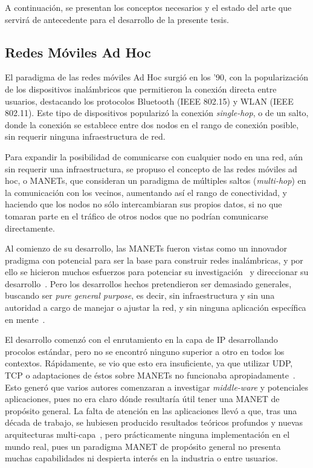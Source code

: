 \documentclass[10pt,preprint,onecolumn]{paper}
\begin{document}
A continuación, se presentan los conceptos necesarios y el estado del arte que servirá de antecedente para el desarrollo de la presente tesis.

\subsection{Redes Móviles Ad Hoc}
\label{sec:manet}
El paradigma de las redes móviles Ad Hoc surgió en los '90, con la popularización de los dispositivos inalámbricos que permitieron la conexión directa entre usuarios, destacando los protocolos Bluetooth (IEEE 802.15) y WLAN (IEEE 802.11). Este tipo de dispositivos popularizó la conexión \emph{single-hop}, o de un salto, donde la conexión se establece entre dos nodos en el rango de conexión posible, sin requerir ninguna infraestructura de red.

Para expandir la posibilidad de comunicarse con cualquier nodo en una red, aún sin requerir una infraestructura, se propuso el concepto de las redes móviles ad hoc, o MANETs, que consideran un paradigma de múltiples saltos (\emph{multi-hop}) en la comunicación con los vecinos, aumentando así el rango de conectividad, y haciendo que los nodos no sólo intercambiaran sus propios datos, si no que tomaran parte en el tráfico de otros nodos que no podrían comunicarse directamente.

Al comienzo de su desarrollo, las MANETs fueron vistas como un innovador pradigma con potencial para ser la base para construir redes inalámbricas, y por ello se hicieron muchos esfuerzos para potenciar su investigación~\cite{manetchal2} y direccionar su desarrollo~\cite{manetchal1}. Pero los desarrollos hechos pretendieron ser demasiado generales, buscando ser \emph{pure general purpose}, es decir, sin infraestructura y sin una autoridad a cargo de manejar o ajustar la red, y sin ninguna aplicación específica en mente~\cite{multi}.

El desarrollo comenzó con el enrutamiento en la capa de IP desarrollando procolos estándar, pero no se encontró ninguno superior a otro en todos los contextos. Rápidamente, se vio que esto era insuficiente, ya que utilizar UDP, TCP o adaptaciones de éstos sobre MANETs no funcionaba apropiadamente~\cite{manetchal1}. Esto generó que varios autores comenzaran a investigar \emph{middle-ware} y potenciales aplicaciones, pues no era claro dónde resultaría útil tener una MANET de propósito general. La falta de atención en las aplicaciones llevó a que, tras una década de trabajo, se hubiesen producido resultados teóricos profundos \cite{teo1, teo2} y nuevas arquitecturas multi-capa~\cite{multi}, pero prácticamente ninguna implementación en el mundo real, pues un paradigma MANET de propósito general no presenta muchas capabilidades ni despierta interés en la industria o entre usuarios. 
\end{document}
